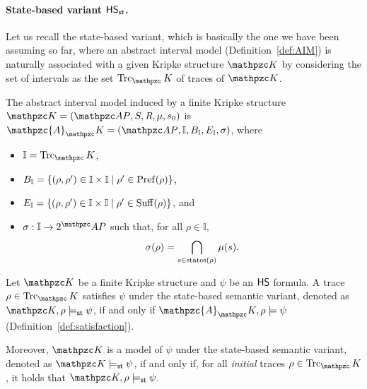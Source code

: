 \paragraph*{State-based variant $\text{\sffamily HS}_{\mathsf{st}}$.} 
Let us recall the state-based variant,
which is basically the one we have been assuming so far,
where 
an abstract interval model  (Definition~\ref{def:AIM})
is naturally associated with a given Kripke structure $\Ku$ %
by considering the set of intervals as the set 
$\Trk_\Ku$
of traces of $\Ku$. 

\begin{definition}
The abstract interval model induced by a finite Kripke structure $\Ku=\KuDef$ is
$\mathpzc{A}_\Ku=(\Prop,\mathbb{I},B_\mathbb{I},E_\mathbb{I},\sigma)$, where
\begin{itemize}
    \item $\mathbb{I}=\Trk_\Ku$,
    \item $B_\mathbb{I}=\{(\rho,\rho')\in\mathbb{I}\times\mathbb{I}\mid \rho'\in\operatorname{Pref}(\rho)\}$,
    \item $E_\mathbb{I}=\{(\rho,\rho')\in\mathbb{I}\times\mathbb{I}\mid \rho'\in\operatorname{Suff}(\rho)\}$, and
    \item $\sigma:\mathbb{I}\to 2^\Prop$ such that, for all $\rho\in\mathbb{I}$, 
        \begin{equation*}
            \sigma(\rho)=\bigcap_{s\in\operatorname{states}(\rho)}\mu(s).
        \end{equation*}
\end{itemize}
\end{definition}

\begin{definition}
Let $\Ku$ be a finite Kripke structure and
$\psi$ be an $\text{\sffamily HS}$ formula.
A trace $\rho\in\Trk_\Ku$ satisfies $\psi$ under the state-based semantic variant,
denoted as $\Ku,\rho\models_\stat \psi$, if and only if $\mathpzc{A}_\Ku,\rho\models \psi$
(Definition~\ref{def:satisfaction}).

Moreover,
$\Ku$ is a model of $\psi$ under the state-based semantic variant, denoted as $\Ku\models_\stat \psi$, if and only if,
for all \emph{initial} traces $\rho\in\Trk_\Ku$, it holds that $\Ku,\rho\models_\stat \psi$.
\end{definition}

